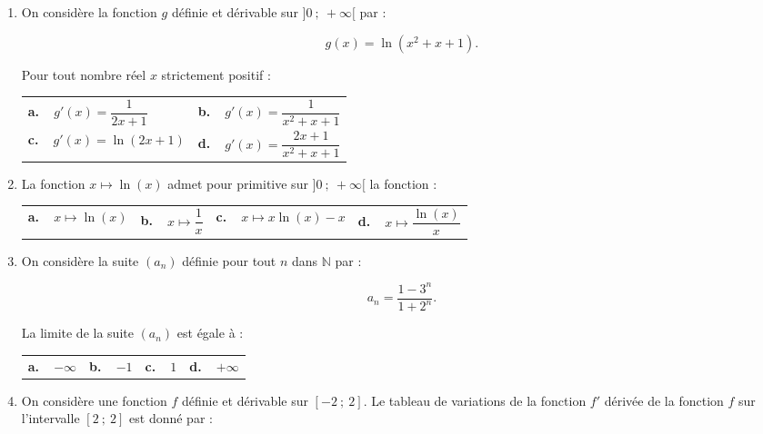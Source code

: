 \documentclass[11pt]{article}
\newcommand{\N}{\mathbb{N}}
\begin{document}
\begin{enumerate}
\item On considère  la fonction $g$ définie et dérivable sur $]0~;~+ \infty[$ par :

\[g(x) = \ln \left(x^2 + x + 1\right).\]

Pour tout nombre réel $x$ strictement positif :

\begin{center}
\begin{tabularx}{\linewidth}{X X}
\textbf{a.~~}$g'(x) = \dfrac{1}{2x + 1}$&\textbf{b.~~}$g'(x) = \dfrac{1}{x^2 + x + 1}$\\[8pt]
\textbf{c.~~}$g'(x) = \ln (2x + 1)$&\textbf{d.~~}$g'(x) = \dfrac{2x + 1}{x^2 + x + 1}$
\end{tabularx}
\end{center}
\item La fonction $x \longmapsto \ln (x)$ admet pour primitive sur $]0~;~+ \infty[$ la fonction :

\begin{center}
\begin{tabularx}{\linewidth}{*{4}{X} }
\textbf{a.~~}$x \longmapsto \ln (x)$&\textbf{b.~~}$x \longmapsto \dfrac{1}{x}$&\textbf{c.~~}$x \longmapsto x \ln (x) - x$&\textbf{d.~~}$x \longmapsto \dfrac{\ln (x)}{x}$
\end{tabularx}
\end{center}
\item On considère la suite $\left(a_n\right)$ définie  pour tout $n$ dans $\N$ par :

\[a_n = \dfrac{1 - 3^n}{1 + 2^n}.\]

La limite de la suite $\left(a_n\right)$ est égale à :

\begin{center}
\begin{tabularx}{\linewidth}{*{4}{X} }
\textbf{a.~~}$- \infty$&\textbf{b.~~}$- 1$&\textbf{c.~~}$1$&\textbf{d.~~}$+ \infty$
\end{tabularx}
\end{center}
\item 
On considère une fonction $f$ définie et dérivable sur $[-2~;~2]$. Le tableau de variations de la fonction $f'$ dérivée de la fonction $f$ sur l'intervalle $[2~;~2]$ est donné par :


\end{enumerate}
\end{document}
